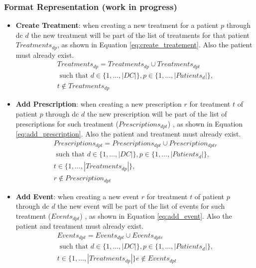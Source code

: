 \subsubsection{Format Representation (work in progress)}
\begin{itemize}
	\item {\bf Create Treatment}: when creating a new treatment for a patient $p$ through \gls{dc} $d$ the new treatment will be part of the list of treatments for that patient $Treatments_{dp}$, as shown in Equation \ref{eq:create_treatement}. Also the patient must already exist.
		\begin{multline} \label{eq:create_treatement}
			Treatments_{dp} = Treatments_{dp} \cup Treatments_{dpt} \\ \text{ such that } d \in \{1,\dots, |DC|\}, p \in \{1,\dots, |Patients_{d}|\}, \\ t \not\in Treatments_{dp}
		\end{multline}
	\item {\bf Add Prescription}: when creating a new prescription $r$ for treatment $t$ of patient $p$ through \gls{dc} $d$ the new prescription will be part of the list of prescriptions for such treatment ($Prescriptions_{dpt}$) , as shown in Equation \ref{eq:add_prescription}. Also the patient and treatment must already exist.
		\begin{multline} \label{eq:add_prescription}
			Prescriptions_{dpt} = Prescriptions_{dpt} \cup Prescription_{dptr}\\ \text{ such that } d \in \{1,\dots, |DC|\}, p \in \{1,\dots, |Patients_{d}|\}, \\ t \in \{1,\dots, |Treatments_{dp}|\}, \\ r \not\in Prescription_{dpt}
		\end{multline}
	\item {\bf Add Event}: when creating a new event $r$ for treatment $t$ of patient $p$ through \gls{dc} $d$ the new event will be part of the list of events for such treatment ($Events_{dpt}$) , as shown in Equation \ref{eq:add_event}. Also the patient and treatment must already exist.
		\begin{multline} \label{eq:add_event}
			Events_{dpt} = Events_{dpt} \cup Events_{dpte}\\ \text{ such that } d \in \{1,\dots, |DC|\}, p \in \{1,\dots, |Patients_{d}|\}, \\ t \in \{1,\dots, |Treatments_{dp}|\} e \not\in Events_{dpt}	
		\end{multline}
\end{itemize}

